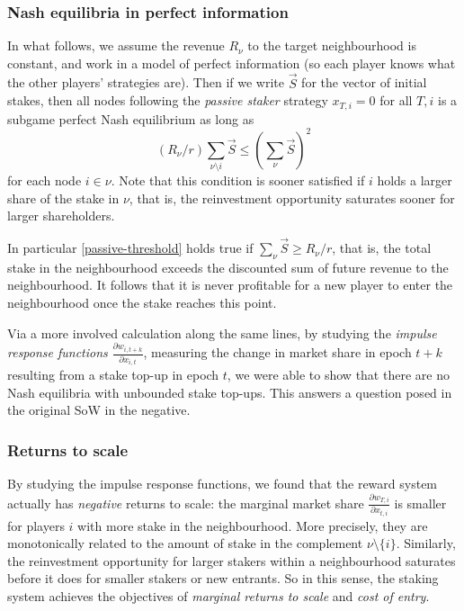 \subsubsection*{Nash equilibria in perfect information}

In what follows, we assume the revenue $R_\nu$ to the target neighbourhood is constant, and work in a model of perfect information (so each player knows what the other players' strategies are). Then if we write $\vec{S}$ for the vector of initial stakes, then all nodes following the \emph{passive staker} strategy $x_{T,i}=0$ for all $T, i$ is a subgame perfect Nash equilibrium as long as
%
\begin{equation} \label{passive-threshold}
 (R_\nu/r)\sum_{\nu\setminus i}\vec{S} \leq \left(\sum_{\nu}\vec{S} \right)^2
\end{equation}
%
for each node $i\in \nu$. 
%
Note that this condition is sooner satisfied if $i$ holds a larger share of the stake in $\nu$, that is, the reinvestment opportunity saturates sooner for larger shareholders.

In particular \eqref{passive-threshold} holds true if $\sum_{\nu}\vec{S}\geq R_\nu/r$, that is, the total stake in the neighbourhood exceeds the discounted sum of future revenue to the neighbourhood.
%
It follows that it is never profitable for a new player to enter the neighbourhood once the stake reaches this point.

Via a more involved calculation along the same lines, by studying the \emph{impulse response functions} $\frac{\partial w_{i,t+k}}{\partial x_{i,t}}$, measuring the change in market share in epoch $t+k$ resulting from a stake top-up in epoch $t$, 
%
we were able to show that there are no Nash equilibria with unbounded stake top-ups. This answers a question posed in the original SoW in the negative.

\subsubsection*{Returns to scale}

By studying the impulse response functions, we found that the reward system actually has \emph{negative} returns to scale: the marginal market share $\frac{\partial w_{T,i}}{\partial x_{t,i}}$ is smaller for players $i$ with more stake in the neighbourhood. More precisely, they are monotonically related to the amount of stake in the complement $\nu\setminus\{i\}$.
%
Similarly, the reinvestment opportunity for larger stakers within a neighbourhood saturates before it does for smaller stakers or new entrants.
%
So in this sense, the staking system achieves the objectives of \emph{marginal returns to scale} and \emph{cost of entry}.

